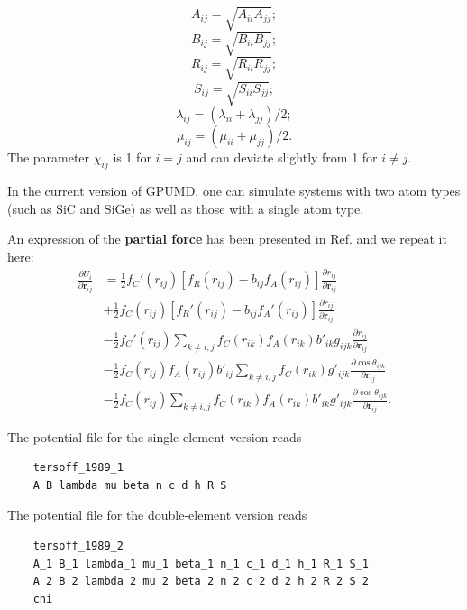 \documentclass[12pt,a4paper]{report}
\newcommand{\vect}[1]{\boldsymbol{#1}}
\begin{document}
\begin{equation}
A_{ij} =  \sqrt{A_{ii} A_{jj}};
\end{equation}
\begin{equation}
B_{ij} =  \sqrt{B_{ii} B_{jj}};
\end{equation}
\begin{equation}
R_{ij} =  \sqrt{R_{ii} R_{jj}};
\end{equation}
\begin{equation}
S_{ij} =  \sqrt{S_{ii} S_{jj}};
\end{equation}
\begin{equation}
\lambda_{ij} =  (\lambda_{ii} + \lambda_{jj})/2;
\end{equation}
\begin{equation}
\mu_{ij} =  (\mu_{ii} + \mu_{jj})/2.
\end{equation}
The parameter $\chi_{ij}$ is 1 for $i=j$ and can deviate slightly from 1 for $i \neq j$.

In the current version of GPUMD, one can simulate systems with two atom types (such as SiC and SiGe) as well as those with a single atom type.

An expression of the \textbf{partial force} has been presented in Ref. \cite{fan2015prb} and we repeat it here:
\begin{align}
\frac{\partial U_i}{\partial \vect{r}_{ij}}
&= \frac{1}{2}f_C'(r_{ij})[f_R(r_{ij})-b_{ij}f_A(r_{ij})]\frac{\partial r_{ij}}{\partial \vect{r}_{ij}} \nonumber \\
&+ \frac{1}{2}f_C(r_{ij})[f_R'(r_{ij})-b_{ij}f_A'(r_{ij})]\frac{\partial r_{ij}}{\partial \vect{r}_{ij}} \nonumber \\
&- \frac{1}{2}f_C'(r_{ij})\sum_{k\neq i,j}f_C(r_{ik})f_A(r_{ik})b'_{ik}g_{ijk} \frac{\partial r_{ij}}{\partial \vect{r}_{ij}} \nonumber \\
&- \frac{1}{2}f_C(r_{ij})f_A(r_{ij})b'_{ij}\sum_{k\neq i,j}f_C(r_{ik})  g'_{ijk}
   \frac{\partial \cos\theta_{ijk}}{\partial \vect{r}_{ij}} \nonumber \\
&- \frac{1}{2}f_C(r_{ij})\sum_{k\neq i,j}f_C(r_{ik})f_A(r_{ik})b'_{ik}  g'_{ijk}
   \frac{\partial \cos\theta_{ijk}}{\partial \vect{r}_{ij}}.
\end{align}


The potential file for the single-element version reads
\begin{verbatim}
    tersoff_1989_1
    A B lambda mu beta n c d h R S
\end{verbatim}
The potential file for the double-element version reads
\begin{verbatim}
    tersoff_1989_2
    A_1 B_1 lambda_1 mu_1 beta_1 n_1 c_1 d_1 h_1 R_1 S_1
    A_2 B_2 lambda_2 mu_2 beta_2 n_2 c_2 d_2 h_2 R_2 S_2
    chi
\end{verbatim}
\end{document}
